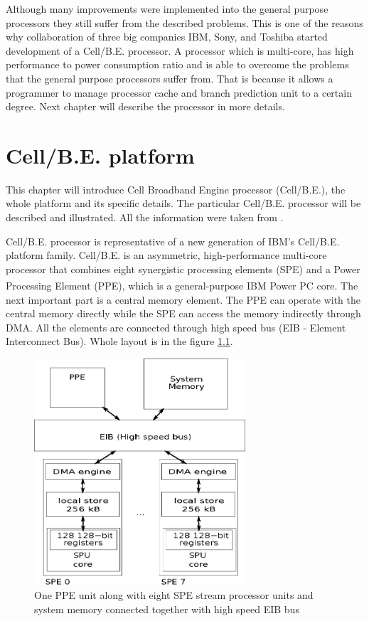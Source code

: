 \par
Although many improvements were implemented into the general purpose processors they still suffer from the described problems.
This is one of the reasons why collaboration of three big companies IBM, Sony, and Toshiba started development of a \mbox{Cell/B.E.} processor.
A processor which is multi-core, has high performance to power consumption ratio and is able to overcome the problems that the general purpose processors suffer from.
That is because it allows a programmer to manage processor cache and branch prediction unit to a certain degree.
Next chapter will describe the processor in more details.

\chapter{\mbox{Cell/B.E.} platform}

This chapter will introduce Cell Broadband Engine processor (\mbox{Cell/B.E.}), the whole platform and its specific details.
The particular \mbox{Cell/B.E.} processor will be described and illustrated.
All the information were taken from \cite{cbeCenter}.

\par
\mbox{Cell/B.E.} processor is representative of a new generation of IBM's \mbox{Cell/B.E.} platform family.
\mbox{Cell/B.E.} is an asymmetric, high-performance multi-core processor that combines eight synergistic processing elements (SPE) and a Power Processing Element (PPE), which is a general-purpose IBM Power PC\textsuperscript{\textregistered} core.
The next important part is a central memory element.
The PPE can operate with the central memory directly while the SPE can access the memory indirectly through DMA.
All the elements are connected through high speed bus (EIB - Element Interconnect Bus).
Whole layout is in the figure \ref{fg:processorLayout}.

\begin{figure}
    \centering
    \includegraphics[width=0.7\textwidth]{data/cellLayout}
    \caption[\mbox{Cell/B.E.} processor layout]{One PPE unit along with eight SPE stream processor units and system memory connected together with high speed EIB bus}
    \label{fg:processorLayout}
\end{figure}

